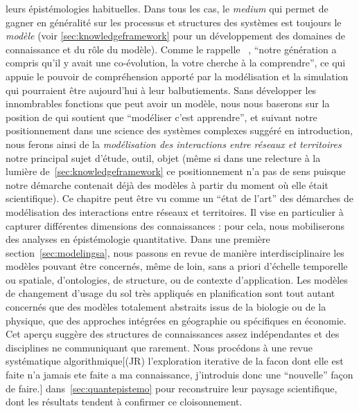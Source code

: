 leurs épistémologies habituelles. Dans tous les cas, le \emph{medium} qui permet de gagner en généralité sur les processus et structures des systèmes est toujours le \emph{modèle} (voir \ref{sec:knowledgeframework} pour un développement des domaines de connaissance et du rôle du modèle). Comme le rappelle ~\cite{raimbault2017entretiens}, ``notre génération a compris qu'il y avait une co-évolution, la votre cherche à la comprendre'', ce qui appuie le pouvoir de compréhension apporté par la modélisation et la simulation qui pourraient être aujourd'hui à leur balbutiements. Sans développer les innombrables fonctions que peut avoir un modèle, nous nous baserons sur la position de  qui soutient que ``modéliser c'est apprendre'', et suivant notre positionnement dans une science des systèmes complexes suggéré en introduction, nous ferons ainsi de la \emph{modélisation des interactions entre réseaux et territoires} notre principal sujet d'étude, outil, objet (même si dans une relecture à la lumière de~\ref{sec:knowledgeframework} ce positionnement n'a pas de sens puisque notre démarche contenait déjà des modèles à partir du moment où elle était scientifique). Ce chapitre peut être vu comme un ``état de l'art'' des démarches de modélisation des interactions entre réseaux et territoires. Il vise en particulier à capturer différentes dimensions des connaissances : pour cela, nous mobiliserons des analyses en épistémologie quantitative. Dans une première section~\ref{sec:modelingsa}, nous passons en revue de manière interdisciplinaire les modèles pouvant être concernés, même de loin, sans a priori d'échelle temporelle ou spatiale, d'ontologies, de structure, ou de contexte d'application. Les modèles de changement d'usage du sol très appliqués en planification sont tout autant concernés que des modèles totalement abstraits issus de la biologie ou de la physique, que des approches intégrées en géographie ou spécifiques en économie. Cet aperçu suggère des structures de connaissances assez indépendantes et des disciplines ne communiquant que rarement. Nous procédons à une revue systématique algorithmique[(JR) l'exploration iterative de la facon dont elle est faite n'a jamais ete faite a ma connaissance, j'introduis donc une ``nouvelle'' façon de faire.]  dans~\ref{sec:quantepistemo} pour reconstruire leur paysage scientifique, dont les résultats tendent à confirmer ce cloisonnement. 
